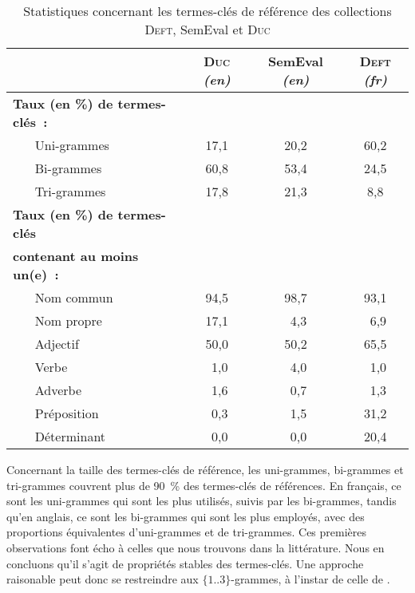       \begin{table}[!h]
        \centering
        \begin{tabular}{ll|ccc}
          \toprule
          & & \textbf{\textsc{Duc}} \textit{(en)} & \textbf{SemEval} \textit{(en)} & \textbf{\textsc{Deft}} \textit{(fr)}\\
          \hline
          \multicolumn{2}{l|}{\textbf{Taux (en \%) de termes-clés~:}}\\
          & Uni-grammes & 17,1 & 20,2 & 60,2\\
          & Bi-grammes & 60,8 & 53,4 & 24,5\\
          & Tri-grammes & 17,8 & 21,3 & 8,8\\
          \hline
          \multicolumn{2}{l|}{\textbf{Taux (en \%) de termes-clés}} & & &\\
          \multicolumn{2}{l|}{\textbf{contenant au moins un(e)~:}} & & &\\
          & Nom commun & 94,5 & 98,7 & 93,1\\
          & Nom propre & 17,1 & $~~$4,3 & $~~$6,9\\
          & Adjectif & 50,0 & 50,2 & 65,5\\
          & Verbe & $~~$1,0 & $~~$4,0 & $~~$1,0\\
          & Adverbe & $~~$1,6 & $~~$0,7 & $~~$1,3\\
          & Préposition & $~~$0,3 & $~~$1,5 & 31,2\\
          & Déterminant & $~~$0,0 & $~~$0,0 & 20,4\\
          \bottomrule
        \end{tabular}
        \caption{Statistiques concernant les termes-clés de référence des
                 collections \textsc{Deft}, SemEval et \textsc{Duc}
                 \label{tab:candidate_selection-train_stats}}
      \end{table}

      Concernant la taille des termes-clés de référence, les uni-grammes,
      bi-grammes et tri-grammes couvrent plus de 90~\% des termes-clés de
      références. En français, ce sont les uni-grammes qui sont les plus
      utilisés, suivis par les bi-grammes, tandis qu'en anglais, ce sont les
      bi-grammes qui sont les plus employés, avec des proportions équivalentes
      d'uni-grammes et de tri-grammes. Ces premières observations font écho à
      celles que nous trouvons dans la littérature. Nous en concluons qu'il
      s'agit de propriétés stables des termes-clés. Une approche raisonable peut
      donc se restreindre aux $\{1..3\}$-grammes, à l'instar de celle de
      .

